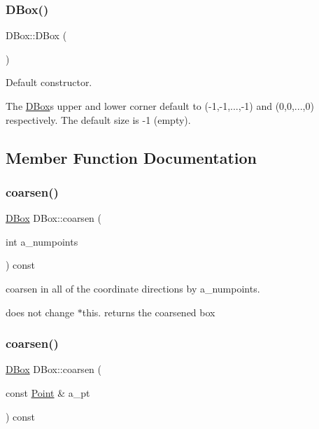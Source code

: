 \subsubsection{\texorpdfstring{D\+Box()}{DBox()}}
{\footnotesize\ttfamily D\+Box\+::\+D\+Box (\begin{DoxyParamCaption}{ }\end{DoxyParamCaption})}



Default constructor. 

The \hyperlink{class_d_box}{D\+Box}\textquotesingle{}s upper and lower corner default to (-\/1,-\/1,...,-\/1) and (0,0,...,0) respectively. The default size is -\/1 (empty). 

\subsection{Member Function Documentation}
\mbox{\label{class_d_box_a0c5ff6539cfad2c35554507a4094a663}} 
\subsubsection{\texorpdfstring{coarsen()}{coarsen()}\hspace{0.1cm}{\footnotesize\ttfamily [1/2]}}
{\footnotesize\ttfamily \hyperlink{class_d_box}{D\+Box} D\+Box\+::coarsen (\begin{DoxyParamCaption}\item[{int}]{a\+\_\+numpoints }\end{DoxyParamCaption}) const}



coarsen in all of the coordinate directions by a\+\_\+numpoints. 

does not change $\ast$this. returns the coarsened box \mbox{\label{class_d_box_aa8b06b12dfb6853ea4a84d03339969dc}} 
\subsubsection{\texorpdfstring{coarsen()}{coarsen()}\hspace{0.1cm}{\footnotesize\ttfamily [2/2]}}
{\footnotesize\ttfamily \hyperlink{class_d_box}{D\+Box} D\+Box\+::coarsen (\begin{DoxyParamCaption}\item[{const \hyperlink{class_point}{Point} \&}]{a\+\_\+pt }\end{DoxyParamCaption}) const}



